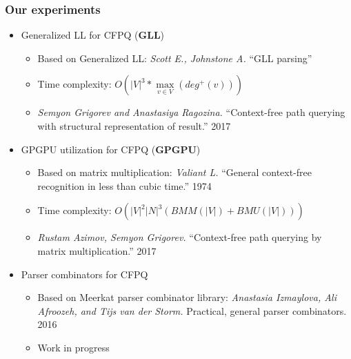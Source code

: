 \documentclass[xcolor=table,aspectratio=169]{beamer}
\begin{document}
\begin{frame}[fragile]
  \transwipe[direction=90]
  \frametitle{Our experiments}

\begin{itemize} 
\item Generalized LL for CFPQ (\textbf{GLL})
\begin{itemize} 
  \item Based on Generalized LL: \emph{Scott E., Johnstone A.} ``GLL parsing''
  \item Time complexity: $O\left(|V|^3*\max\limits_{v \in V}\left(deg^+\left(v\right)\right)\right)$
  \item \emph{Semyon Grigorev and Anastasiya Ragozina.} ``Context-free path querying with structural 
  representation of result.'' 2017
\end{itemize}
\pause
\item GPGPU utilization for CFPQ (\textbf{GPGPU})
\begin{itemize} 
   \item Based on matrix  multiplication: \emph{Valiant L.} ``General context-free recognition in less than cubic time.'' 1974
   \item Time complexity: $O(|V|^2 |N|^3(BMM(|V|) + BMU(|V|)))$
   \item \emph{Rustam Azimov, Semyon Grigorev.} ``Context-free path querying by matrix 
     multiplication.'' 2017
\end{itemize}
\pause
\item Parser combinators for CFPQ
\begin{itemize} 
  \item Based on Meerkat parser combinator library: \emph{Anastasia Izmaylova, Ali Afroozeh, and Tijs van der Storm.} 
  Practical, general parser combinators. 2016
  \item Work in progress
\end{itemize}

\end{itemize}
\end{frame}
\end{document}
